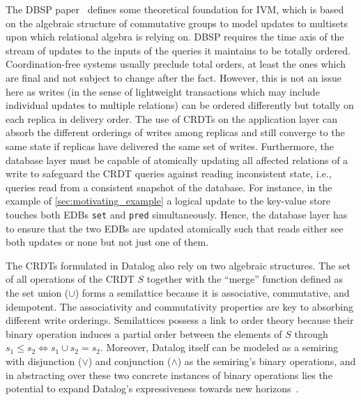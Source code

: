 \documentclass{article}
\newcommand{\code}[1]{\texttt{#1}}
\begin{document}
The DBSP paper~\cite{budiu2022dbsp} defines some theoretical foundation for IVM,
which is based on the algebraic structure of commutative groups
to model updates to multisets upon which relational algebra is relying on.
DBSP requires the time axis of the stream of updates to the inputs of the
queries it maintains to be totally ordered.
Coordination-free systems usually preclude total orders, at least the ones which
are final and not subject to change after the fact.
However, this is not an issue here as writes (in the sense of lightweight
transactions which may include individual updates to multiple relations)
can be ordered differently but totally on each replica in delivery order.
The use of CRDTs on the application layer can absorb the different orderings
of writes among replicas and still converge to the same state
if replicas have delivered the same set of writes.
Furthermore, the database layer must be capable of atomically updating all affected
relations of a write to safeguard the CRDT queries against reading inconsistent
state, i.e., queries read from a consistent snapshot of the database.
For instance, in the example of \autoref{sec:motivating_example} a logical update
to the key-value store touches both EDBs \code{set} and \code{pred}
simultaneously.
Hence, the database layer has to ensure that the two EDBs are updated atomically
such that reads either see both updates or none but not just one of them.

The CRDTs formulated in Datalog also rely on two algebraic structures.
The set of all operations of the CRDT \(S\) together with
the ``merge'' function defined as the set union (\(\cup\)) forms a semilattice
because it is associative, commutative, and idempotent.
The associativity and commutativity properties are key to absorbing
different write orderings.
Semilattices possess a link to order theory because their binary operation
induces a partial order between the elements of \(S\) through
\(s_1 \leq s_2 \Leftrightarrow s_1 \cup s_2 = s_2\).
Moreover, Datalog itself can be modeled as a semiring with
disjunction (\(\lor\)) and conjunction (\(\land\)) as the semiring's
binary operations, and in abstracting over these two concrete instances
of binary operations lies the potential to expand Datalog's expressiveness
towards new horizons~\cite{abo2024convergence}.
\end{document}
